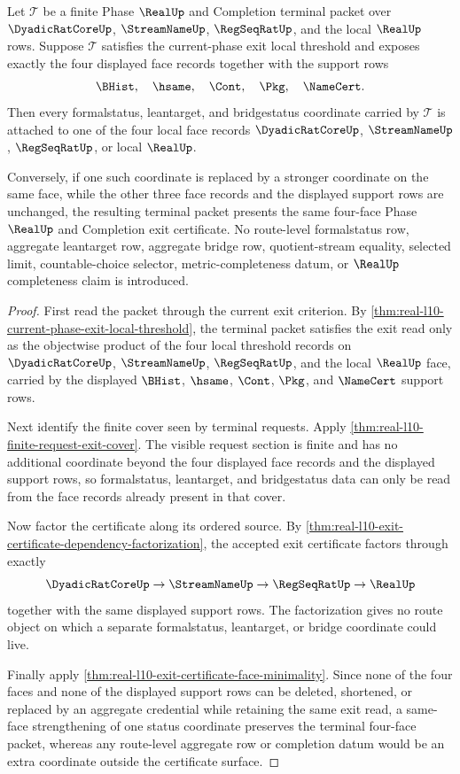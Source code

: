 \begin{theorem}
\label{thm:real-l10-terminal-four-face-status-locality}
Let $\mathcal T$ be a finite Phase $\RealUp$ and Completion terminal packet over $\DyadicRatCoreUp$, $\StreamNameUp$, $\RegSeqRatUp$, and the local $\RealUp$ rows. Suppose $\mathcal T$ satisfies the current-phase exit local threshold and exposes exactly the four displayed face records together with the support rows
$$
\BHist,\quad \hsame,\quad \Cont,\quad \Pkg,\quad \NameCert.
$$
Then every formalstatus, leantarget, and bridgestatus coordinate carried by $\mathcal T$ is attached to one of the four local face records $\DyadicRatCoreUp$, $\StreamNameUp$, $\RegSeqRatUp$, or local $\RealUp$.

Conversely, if one such coordinate is replaced by a stronger coordinate on the same face, while the other three face records and the displayed support rows are unchanged, the resulting terminal packet presents the same four-face Phase $\RealUp$ and Completion exit certificate. No route-level formalstatus row, aggregate leantarget row, aggregate bridge row, quotient-stream equality, selected limit, countable-choice selector, metric-completeness datum, or $\RealUp$ completeness claim is introduced.
\end{theorem}
\begin{proof}
First read the packet through the current exit criterion. By \autoref{thm:real-l10-current-phase-exit-local-threshold}, the terminal packet satisfies the exit read only as the objectwise product of the four local threshold records on $\DyadicRatCoreUp$, $\StreamNameUp$, $\RegSeqRatUp$, and the local $\RealUp$ face, carried by the displayed $\BHist$, $\hsame$, $\Cont$, $\Pkg$, and $\NameCert$ support rows.

Next identify the finite cover seen by terminal requests. Apply \autoref{thm:real-l10-finite-request-exit-cover}. The visible request section is finite and has no additional coordinate beyond the four displayed face records and the displayed support rows, so formalstatus, leantarget, and bridgestatus data can only be read from the face records already present in that cover.

Now factor the certificate along its ordered source. By \autoref{thm:real-l10-exit-certificate-dependency-factorization}, the accepted exit certificate factors through exactly
$$
\DyadicRatCoreUp \to \StreamNameUp \to \RegSeqRatUp \to \RealUp
$$
together with the same displayed support rows. The factorization gives no route object on which a separate formalstatus, leantarget, or bridge coordinate could live.

Finally apply \autoref{thm:real-l10-exit-certificate-face-minimality}. Since none of the four faces and none of the displayed support rows can be deleted, shortened, or replaced by an aggregate credential while retaining the same exit read, a same-face strengthening of one status coordinate preserves the terminal four-face packet, whereas any route-level aggregate row or completion datum would be an extra coordinate outside the certificate surface.
\end{proof}

